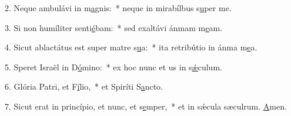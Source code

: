 2. Neque ambulávi in m\uline{a}gnis:~* neque in mirabílbus s\uline{u}per me.\par 
3. Si non humíliter senti\uline{é}bam:~* sed exaltávi ánmam m\uline{e}am.\par 
4. Sicut ablactátus est super matre s\uline{u}a:~* ita retribútio in ánma m\uline{e}a.\par 
5. Speret Israël in D\uline{ó}mino:~* ex hoc nunc et us in s\uline{ǽ}culum.\par 
6. Glória Patri, et F\uline{í}lio,~* et Spiríti S\uline{a}ncto.\par 
7. Sicut erat in princípio, et nunc, et s\uline{e}mper,~* et in sǽcula sæculrum. \uline{A}men.\par 
